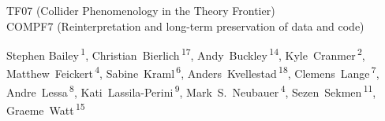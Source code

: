 \documentclass[11pt]{article}
\begin{document}
\pubblock

\snowmass{}


\begin{center}{\large
TF07 (Collider Phenomenology in the Theory Frontier)\\
COMPF7 (Reinterpretation and long-term preservation of data and code)}
\end{center}



\begin{center}
Stephen Bailey\,\textsuperscript{1},  %
Christian~Bierlich\,\textsuperscript{17},
Andy~Buckley\,\textsuperscript{14},
Kyle~Cranmer\,\textsuperscript{2},
Matthew~Feickert\,\textsuperscript{4},
Sabine~Kraml\,\textsuperscript{6},
Anders~Kvellestad\,\textsuperscript{18},
Clemens~Lange\,\textsuperscript{7},
Andre~Lessa\,\textsuperscript{8},
Kati~Lassila-Perini\,\textsuperscript{9},
Mark~S.~Neubauer\,\textsuperscript{4},
Sezen~Sekmen\,\textsuperscript{11},
Graeme~Watt\,\textsuperscript{15}
\end{center}
\end{document}
